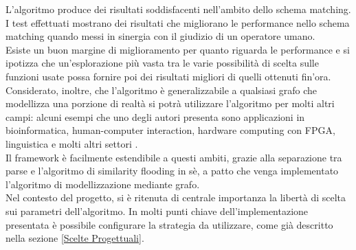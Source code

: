 \documentclass[a4paper,10pt]{article}
\begin{document}
L’algoritmo produce dei risultati soddisfacenti nell’ambito dello schema matching. I test effettuati mostrano dei risultati che migliorano le performance nello schema matching quando messi in sinergia con il giudizio di un operatore umano.\\

Esiste un buon margine di miglioramento per quanto riguarda le performance e si ipotizza che un'esplorazione più vasta tra le varie possibilità di scelta sulle funzioni usate possa fornire poi dei risultati migliori di quelli ottenuti fin'ora.\\

Considerato, inoltre, che l’algoritmo è generalizzabile a qualsiasi grafo che modellizza una porzione di realtà si potrà utilizzare l’algoritmo per molti altri campi: alcuni esempi che uno degli autori presenta sono applicazioni in bioinformatica, human-computer interaction, hardware computing con FPGA, linguistica e molti altri settori \cite{decade_after_flooding}.\\

Il framework è facilmente estendibile a questi ambiti, grazie alla separazione tra parse e l’algoritmo di similarity flooding in sè, a patto che venga implementato l’algoritmo di modellizzazione mediante grafo.\\

Nel contesto del progetto, si è ritenuta di centrale importanza la libertà di scelta sui parametri dell’algoritmo. In molti punti chiave dell’implementazione presentata è possibile configurare la strategia da utilizzare, come già descritto nella sezione \ref{Scelte Progettuali}.\\
\end{document}
